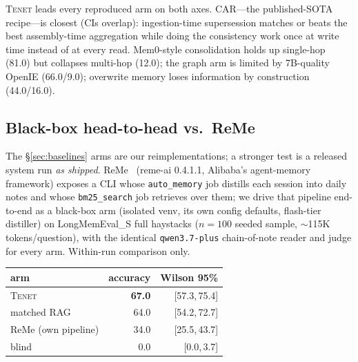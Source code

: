 \documentclass[11pt]{article}
\newcommand{\tenet}{\textsc{Tenet}}
\newcommand{\ci}[2]{{\footnotesize[#1,\,#2]}}
\begin{document}
\tenet{} leads every reproduced arm on both axes. CAR---the published-SOTA
recipe---is closest (CIs overlap): ingestion-time supersession matches or beats the best
assembly-time aggregation while doing the consistency work once at write time instead of
at every read. Mem0-style consolidation holds up single-hop (81.0) but collapses
multi-hop (12.0); the graph arm is limited by 7B-quality OpenIE (66.0/9.0); overwrite
memory loses information by construction (44.0/16.0).

\subsection{Black-box head-to-head vs.\ ReMe}\label{sec:reme}
The \S\ref{sec:baselines} arms are our reimplementations; a stronger test is a released
system run \emph{as shipped}. ReMe~\cite{reme} (reme-ai 0.4.1.1, Alibaba's agent-memory
framework) exposes a CLI whose \texttt{auto\_memory} job distills each session into
daily notes and whose \texttt{bm25\_search} job retrieves over them; we drive that
pipeline end-to-end as a black-box arm (isolated venv, its own config defaults,
flash-tier distiller) on LongMemEval\_S full haystacks ($n{=}100$ seeded sample,
$\sim$115K tokens/question), with the identical \texttt{qwen3.7-plus} chain-of-note
reader and judge for every arm. Within-run comparison only.

\begin{center}
\small
\begin{tabular}{lrr}
\toprule
arm & accuracy & Wilson 95\%\\
\midrule
\tenet{} & \textbf{67.0} & \ci{57.3}{75.4}\\
matched RAG & 64.0 & \ci{54.2}{72.7}\\
ReMe (own pipeline) & 34.0 & \ci{25.5}{43.7}\\
blind & 0.0 & \ci{0.0}{3.7}\\
\bottomrule
\end{tabular}
\end{center}
\end{document}

